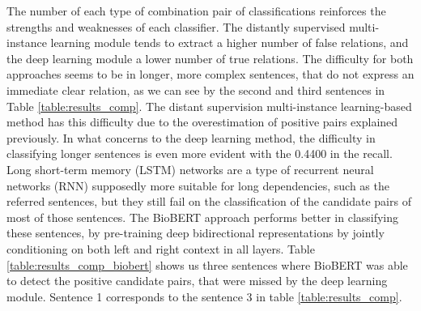 The number of each type of combination pair of classifications reinforces the strengths and weaknesses of each classifier. The distantly supervised multi-instance learning module tends to extract a higher number of false relations, and the deep learning module a lower number of true relations. The difficulty for both approaches seems to be in longer, more complex sentences, that do not express an immediate clear relation, as we can see by the second and third sentences in Table \ref{table:results_comp}. The distant supervision multi-instance learning-based method has this difficulty due to the overestimation of positive pairs explained previously. In what concerns to the deep learning method, the difficulty in classifying longer sentences is even more evident with the 0.4400 in the recall. Long short-term memory (LSTM) networks are a type of recurrent neural networks (RNN) supposedly more suitable for long dependencies, such as the referred sentences, but they still fail on the classification of the candidate pairs of most of those sentences. The BioBERT approach performs better in classifying these sentences, by pre-training deep bidirectional representations by jointly conditioning on both left and right context in all layers. Table \ref{table:results_comp_biobert} shows us three sentences where BioBERT was able to detect the positive candidate pairs, that were missed by the deep learning module. Sentence 1 corresponds to the sentence 3 in table \ref{table:results_comp}.

